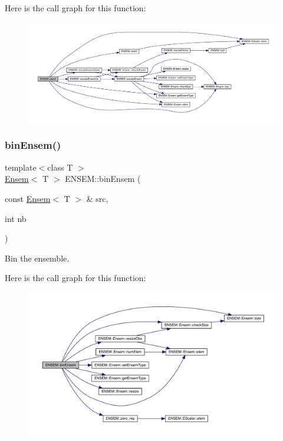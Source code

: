 Here is the call graph for this function\+:\nopagebreak
\begin{figure}[H]
\begin{center}
\leavevmode
\includegraphics[width=350pt]{d1/d9e/group__eensem_ga04b957edb43f4b1eee36cecfac095807_cgraph}
\end{center}
\end{figure}
\mbox{\label{group__eensem_ga26ac0e4150e2c67b69a13b6965beb29f}} 
\subsubsection{\texorpdfstring{binEnsem()}{binEnsem()}}
{\footnotesize\ttfamily template$<$class T $>$ \\
\mbox{\hyperlink{classENSEM_1_1Ensem}{Ensem}}$<$ T $>$ E\+N\+S\+E\+M\+::bin\+Ensem (\begin{DoxyParamCaption}\item[{const \mbox{\hyperlink{classENSEM_1_1Ensem}{Ensem}}$<$ T $>$ \&}]{src,  }\item[{int}]{nb }\end{DoxyParamCaption})\hspace{0.3cm}{\ttfamily [inline]}}



Bin the ensemble. 

Here is the call graph for this function\+:\nopagebreak
\begin{figure}[H]
\begin{center}
\leavevmode
\includegraphics[width=350pt]{d1/d9e/group__eensem_ga26ac0e4150e2c67b69a13b6965beb29f_cgraph}
\end{center}
\end{figure}
\mbox{\label{group__eensem_gaed2aa58870f554b9ad30212f8d25ca46}} 
